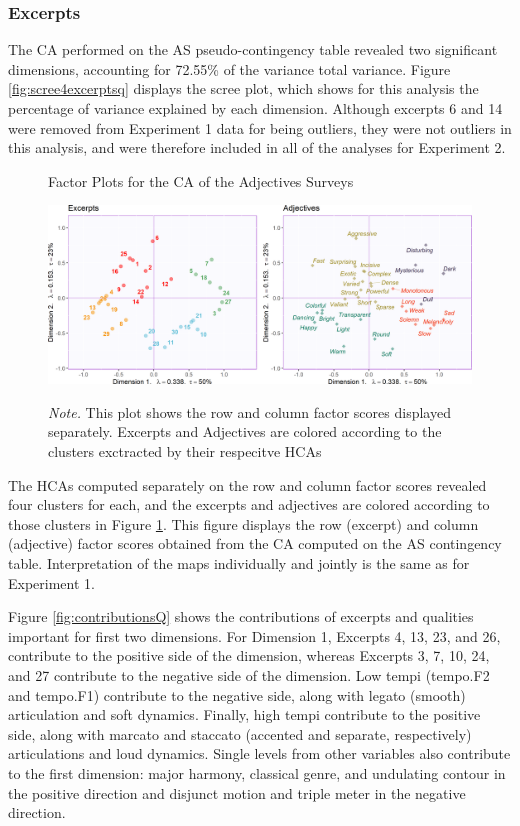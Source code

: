 \documentclass[
  english,
  man,floatsintext]{apa6}
\begin{document}
\hypertarget{excerpts-1}{%
\subsubsection{Excerpts}\label{excerpts-1}}

The CA performed on the AS pseudo-contingency table revealed two significant dimensions, accounting for 72.55\% of the variance total variance. Figure \ref{fig:scree4excerptsq} displays the scree plot, which shows for this analysis the percentage of variance explained by each dimension. Although excerpts 6 and 14 were removed from Experiment 1 data for being outliers, they were not outliers in this analysis, and were therefore included in all of the analyses for Experiment 2.

\begin{figure}   
  \centering  
  \caption{Factor Plots for the CA of the Adjectives Surveys}
    \includegraphics{./Music-Descriptor-Space_files/figure-latex/factormapsA-1.png}
  \label{fig:factormapsA}
  \caption*{\footnotesize \textit{Note.}  This plot shows the row and column factor scores displayed separately. Excerpts and Adjectives are colored according to the clusters exctracted by their respecitve HCAs}
\end{figure}

The HCAs computed separately on the row and column factor scores revealed four clusters for each, and the excerpts and adjectives are colored according to those clusters in Figure \ref{fig:factormapsA}. This figure displays the row (excerpt) and column (adjective) factor scores obtained from the CA computed on the AS contingency table. Interpretation of the maps individually and jointly is the same as for Experiment 1.

Figure \ref{fig:contributionsQ} shows the contributions of excerpts and qualities important for first two dimensions. For Dimension 1, Excerpts 4, 13, 23, and 26, contribute to the positive side of the dimension, whereas Excerpts 3, 7, 10, 24, and 27 contribute to the negative side of the dimension. Low tempi (tempo.F2 and tempo.F1) contribute to the negative side, along with legato (smooth) articulation and soft dynamics. Finally, high tempi contribute to the positive side, along with marcato and staccato (accented and separate, respectively) articulations and loud dynamics. Single levels from other variables also contribute to the first dimension: major harmony, classical genre, and undulating contour in the positive direction and disjunct motion and triple meter in the negative direction.
\end{document}

